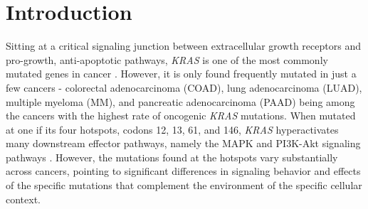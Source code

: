 \documentclass[english, 12pt, letterpaper]{article}
\newcommand{\KRAS}{\emph{KRAS}}
\begin{document}
\section*{Introduction}

Sitting at a critical signaling junction between extracellular growth receptors and pro-growth, anti-apoptotic pathways, \KRAS{} is one of the most commonly mutated genes in cancer \cite{Barbacid1987, Bailey2018}.
However, it is only found frequently mutated in just a few cancers - colorectal adenocarcinoma (COAD), lung adenocarcinoma (LUAD), multiple myeloma (MM), and pancreatic adenocarcinoma (PAAD) being among the cancers with the highest rate of oncogenic \KRAS{} mutations.
When mutated at one if its four hotspots, codons 12, 13, 61, and 146, \KRAS{} hyperactivates many downstream effector pathways, namely the MAPK and PI3K-Akt signaling pathways \cite{Simanshu2017}.
However, the mutations found at the hotspots vary substantially across cancers, pointing to significant differences in signaling behavior and effects of the specific mutations that complement the environment of the specific cellular context.
\end{document}

